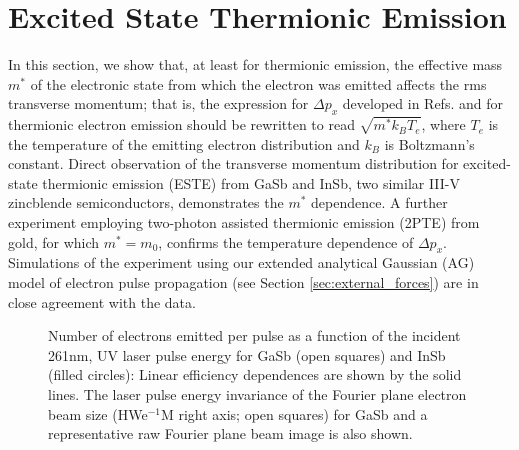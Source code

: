 
\section{Excited State Thermionic Emission}

In this section, we show that, at least for thermionic emission, the effective mass $m^*$ of the electronic state from which the electron was emitted affects the rms transverse momentum; that is, the expression for $\Delta p_x$ developed in Refs. \cite{dowell_quantum_2009} and \cite{jensen_emittance_2010} for thermionic electron emission should be rewritten to read $\sqrt{m^* k_B T_e}$, where $T_e$ is the temperature of the emitting electron distribution and $k_B$ is Boltzmann's constant.
Direct observation of the transverse momentum distribution for excited-state thermionic emission (ESTE) from GaSb and InSb, two similar III-V zincblende semiconductors, demonstrates the $m^*$ dependence.  A further experiment employing two-photon assisted thermionic emission (2PTE) from gold, for which $m^* = m_0$\cite{johnson_optical_1972}, confirms the temperature dependence of $\Delta p_x$.  Simulations of the experiment using our extended analytical Gaussian (AG) model of electron pulse propagation (see Section \ref{sec:external_forces}) are in close agreement with the data. 

\begin{figure}
  \centering
  
  \caption[Electron emission vs UV laser pulse energy for GaSb and InSb]{
    Number of electrons emitted per pulse as a function of the incident 261nm, UV laser pulse energy for GaSb (open squares) and InSb (filled circles): Linear efficiency dependences are shown by the solid lines.
    The laser pulse energy invariance of the Fourier plane electron beam size (HWe$^{-1}$M right axis; open squares) for GaSb and a representative raw Fourier plane beam image is also shown.
  }
  \label{fig:este-semicond}
\end{figure}

